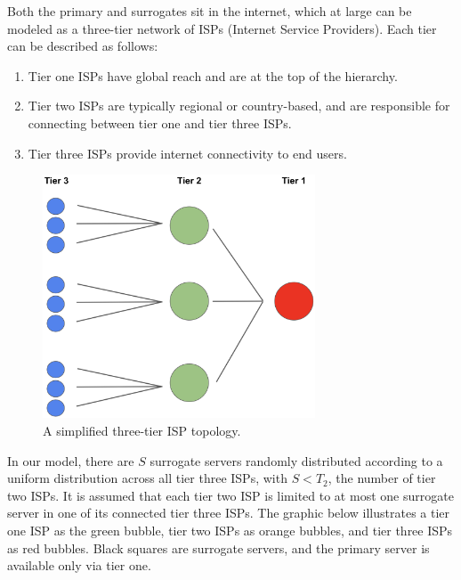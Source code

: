 \documentclass[
	a4paper, %
	10pt, %
	unnumberedsections, %
	twoside, %
]{LTJournalArticle}
\begin{document}
Both the primary and surrogates sit in the internet, which at large can be modeled as a three-tier network of ISPs (Internet Service Providers). Each tier can be described as follows:
\begin{enumerate}
    \item Tier one ISPs have global reach and are at the top of the hierarchy.
    \item Tier two ISPs are typically regional or country-based, and are responsible for connecting between tier one and tier three ISPs.
    \item Tier three ISPs provide internet connectivity to end users.
\end{enumerate}

\begin{figure}[h]
	\begin{center}
		\includegraphics[width=8.1cm]{tier-2.png}
	\end{center}
	\caption{A simplified three-tier ISP topology.}	
\end{figure}

In our model, there are $S$ surrogate servers randomly distributed according to a uniform distribution across all tier three ISPs, with $S < T_2$, the number of tier two ISPs. It is assumed that each tier two ISP is limited to at most one surrogate server in one of its connected tier three ISPs. The graphic below illustrates a tier one ISP as the green bubble, tier two ISPs as orange bubbles, and tier three ISPs as red bubbles. Black squares are surrogate servers, and the primary server is available only via tier one.
\end{document}
